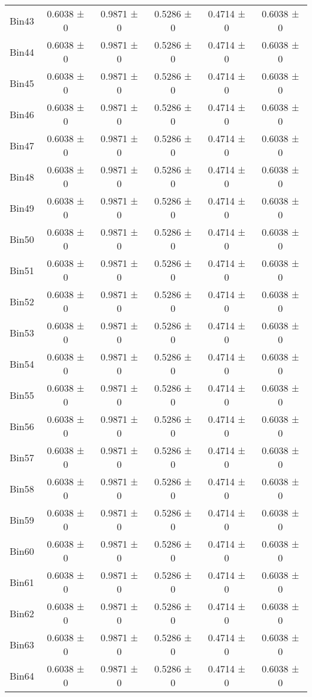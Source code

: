 \begin{tabular}{@{\extracolsep{4pt}}lccccc@{}}
     Bin43 & 0.6038 ± 0 & 0.9871 ± 0 & 0.5286 ± 0 & 0.4714 ± 0 & 0.6038 ± 0 \\ 
     Bin44 & 0.6038 ± 0 & 0.9871 ± 0 & 0.5286 ± 0 & 0.4714 ± 0 & 0.6038 ± 0 \\ 
     Bin45 & 0.6038 ± 0 & 0.9871 ± 0 & 0.5286 ± 0 & 0.4714 ± 0 & 0.6038 ± 0 \\ 
     Bin46 & 0.6038 ± 0 & 0.9871 ± 0 & 0.5286 ± 0 & 0.4714 ± 0 & 0.6038 ± 0 \\ 
     Bin47 & 0.6038 ± 0 & 0.9871 ± 0 & 0.5286 ± 0 & 0.4714 ± 0 & 0.6038 ± 0 \\ 
     Bin48 & 0.6038 ± 0 & 0.9871 ± 0 & 0.5286 ± 0 & 0.4714 ± 0 & 0.6038 ± 0 \\ 
     Bin49 & 0.6038 ± 0 & 0.9871 ± 0 & 0.5286 ± 0 & 0.4714 ± 0 & 0.6038 ± 0 \\ 
     Bin50 & 0.6038 ± 0 & 0.9871 ± 0 & 0.5286 ± 0 & 0.4714 ± 0 & 0.6038 ± 0 \\ 
     Bin51 & 0.6038 ± 0 & 0.9871 ± 0 & 0.5286 ± 0 & 0.4714 ± 0 & 0.6038 ± 0 \\ 
     Bin52 & 0.6038 ± 0 & 0.9871 ± 0 & 0.5286 ± 0 & 0.4714 ± 0 & 0.6038 ± 0 \\ 
     Bin53 & 0.6038 ± 0 & 0.9871 ± 0 & 0.5286 ± 0 & 0.4714 ± 0 & 0.6038 ± 0 \\ 
     Bin54 & 0.6038 ± 0 & 0.9871 ± 0 & 0.5286 ± 0 & 0.4714 ± 0 & 0.6038 ± 0 \\ 
     Bin55 & 0.6038 ± 0 & 0.9871 ± 0 & 0.5286 ± 0 & 0.4714 ± 0 & 0.6038 ± 0 \\ 
     Bin56 & 0.6038 ± 0 & 0.9871 ± 0 & 0.5286 ± 0 & 0.4714 ± 0 & 0.6038 ± 0 \\ 
     Bin57 & 0.6038 ± 0 & 0.9871 ± 0 & 0.5286 ± 0 & 0.4714 ± 0 & 0.6038 ± 0 \\ 
     Bin58 & 0.6038 ± 0 & 0.9871 ± 0 & 0.5286 ± 0 & 0.4714 ± 0 & 0.6038 ± 0 \\ 
     Bin59 & 0.6038 ± 0 & 0.9871 ± 0 & 0.5286 ± 0 & 0.4714 ± 0 & 0.6038 ± 0 \\ 
     Bin60 & 0.6038 ± 0 & 0.9871 ± 0 & 0.5286 ± 0 & 0.4714 ± 0 & 0.6038 ± 0 \\ 
     Bin61 & 0.6038 ± 0 & 0.9871 ± 0 & 0.5286 ± 0 & 0.4714 ± 0 & 0.6038 ± 0 \\ 
     Bin62 & 0.6038 ± 0 & 0.9871 ± 0 & 0.5286 ± 0 & 0.4714 ± 0 & 0.6038 ± 0 \\ 
     Bin63 & 0.6038 ± 0 & 0.9871 ± 0 & 0.5286 ± 0 & 0.4714 ± 0 & 0.6038 ± 0 \\ 
     Bin64 & 0.6038 ± 0 & 0.9871 ± 0 & 0.5286 ± 0 & 0.4714 ± 0 & 0.6038 ± 0 \\ 

\end{tabular}
